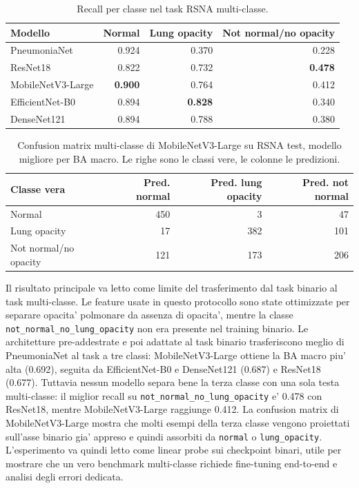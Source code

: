 \documentclass[11pt,a4paper]{article}
\begin{document}
\begin{table}[H]
\centering
\caption{Recall per classe nel task RSNA multi-classe.}
\begin{tabular}{lrrr}
\toprule
Modello & Normal & Lung opacity & Not normal/no opacity \\
\midrule
PneumoniaNet & 0.924 & 0.370 & 0.228 \\
ResNet18 & 0.822 & 0.732 & \textbf{0.478} \\
MobileNetV3-Large & \textbf{0.900} & 0.764 & 0.412 \\
EfficientNet-B0 & 0.894 & \textbf{0.828} & 0.340 \\
DenseNet121 & 0.894 & 0.788 & 0.380 \\
\bottomrule
\end{tabular}
\end{table}

\begin{table}[H]
\centering
\caption{Confusion matrix multi-classe di MobileNetV3-Large su RSNA test, modello migliore per BA macro. Le righe sono le classi vere, le colonne le predizioni.}
\begin{tabular}{lrrr}
\toprule
Classe vera & Pred. normal & Pred. lung opacity & Pred. not normal \\
\midrule
Normal & 450 & 3 & 47 \\
Lung opacity & 17 & 382 & 101 \\
Not normal/no opacity & 121 & 173 & 206 \\
\bottomrule
\end{tabular}
\end{table}

Il risultato principale va letto come limite del trasferimento dal task binario
al task multi-classe. Le feature usate in questo protocollo sono state ottimizzate
per separare opacita' polmonare da assenza di opacita', mentre la classe
\texttt{not\_normal\_no\_lung\_opacity} non era presente nel training binario.
Le architetture pre-addestrate e poi adattate al task binario trasferiscono
meglio di PneumoniaNet al task a tre classi: MobileNetV3-Large ottiene la BA
macro piu' alta (0.692), seguita da EfficientNet-B0 e DenseNet121 (0.687) e
ResNet18 (0.677). Tuttavia nessun modello separa bene la terza classe con una
sola testa multi-classe: il miglior recall su
\texttt{not\_normal\_no\_lung\_opacity} e' 0.478 con ResNet18, mentre
MobileNetV3-Large raggiunge 0.412. La confusion matrix di MobileNetV3-Large
mostra che molti esempi della terza classe vengono proiettati sull'asse binario
gia' appreso e quindi assorbiti da \texttt{normal} o \texttt{lung\_opacity}.
L'esperimento va quindi letto come linear probe sui checkpoint binari, utile per
mostrare che un vero benchmark multi-classe richiede fine-tuning end-to-end e
analisi degli errori dedicata.
\end{document}
